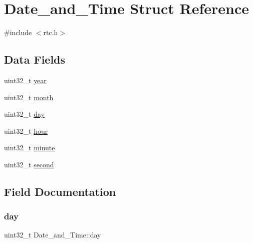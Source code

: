 \hypertarget{struct_date__and___time}{}\section{Date\+\_\+and\+\_\+\+Time Struct Reference}
\label{struct_date__and___time}


{\ttfamily \#include $<$rtc.\+h$>$}

\subsection*{Data Fields}
\begin{DoxyCompactItemize}
\item 
uint32\+\_\+t \mbox{\hyperlink{struct_date__and___time_ade104bcb05e7817e04904bee37fc1acb}{year}}
\item 
uint32\+\_\+t \mbox{\hyperlink{struct_date__and___time_a7c3abab3a768559d283075753cfa822c}{month}}
\item 
uint32\+\_\+t \mbox{\hyperlink{struct_date__and___time_a83e892ad2d13f55818bab022239dbb4a}{day}}
\item 
uint32\+\_\+t \mbox{\hyperlink{struct_date__and___time_adaadd3d3ede5d302aa1c29db9a8d3a2e}{hour}}
\item 
uint32\+\_\+t \mbox{\hyperlink{struct_date__and___time_a748e5a8772cc82138e56fd54fd4ae7a8}{minute}}
\item 
uint32\+\_\+t \mbox{\hyperlink{struct_date__and___time_aed8b75bcb223dd5828a2b8ed0b5c9eec}{second}}
\end{DoxyCompactItemize}


\subsection{Field Documentation}
\mbox{\label{struct_date__and___time_a83e892ad2d13f55818bab022239dbb4a}} 
\subsubsection{\texorpdfstring{day}{day}}
{\footnotesize\ttfamily uint32\+\_\+t Date\+\_\+and\+\_\+\+Time\+::day}

\mbox{\label{struct_date__and___time_adaadd3d3ede5d302aa1c29db9a8d3a2e}} 
